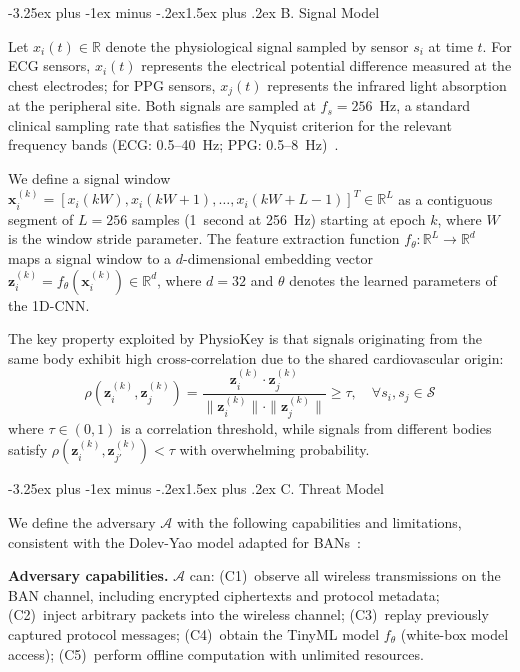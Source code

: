 \documentclass[10pt,twocolumn]{article}
\makeatletter
\renewcommand{\subsection}{\@startsection{subsection}{2}{\z@}%
  {-3.25ex plus -1ex minus -.2ex}{1.5ex plus .2ex}%
  {\normalfont\normalsize\bfseries\itshape}}
\makeatother
\begin{document}
\subsection{B. Signal Model}
\label{subsec:signal_model}

Let $x_i(t) \in \mathbb{R}$ denote the physiological signal sampled by sensor $s_i$ at time $t$. For ECG sensors, $x_i(t)$ represents the electrical potential difference measured at the chest electrodes; for PPG sensors, $x_j(t)$ represents the infrared light absorption at the peripheral site. Both signals are sampled at $f_s = 256$~Hz, a standard clinical sampling rate that satisfies the Nyquist criterion for the relevant frequency bands (ECG: 0.5--40~Hz; PPG: 0.5--8~Hz)~\cite{clifford2006advanced}.

We define a signal window $\mathbf{x}_i^{(k)} = [x_i(kW), x_i(kW+1), \ldots, x_i(kW+L-1)]^T \in \mathbb{R}^L$ as a contiguous segment of $L = 256$ samples (1~second at 256~Hz) starting at epoch $k$, where $W$ is the window stride parameter. The feature extraction function $f_\theta: \mathbb{R}^L \rightarrow \mathbb{R}^d$ maps a signal window to a $d$-dimensional embedding vector $\mathbf{z}_i^{(k)} = f_\theta(\mathbf{x}_i^{(k)}) \in \mathbb{R}^d$, where $d = 32$ and $\theta$ denotes the learned parameters of the 1D-CNN.

The key property exploited by PhysioKey is that signals originating from the same body exhibit high cross-correlation due to the shared cardiovascular origin:
\begin{equation}
\label{eq:correlation}
\rho(\mathbf{z}_i^{(k)}, \mathbf{z}_j^{(k)}) = \frac{\mathbf{z}_i^{(k)} \cdot \mathbf{z}_j^{(k)}}{\|\mathbf{z}_i^{(k)}\| \cdot \|\mathbf{z}_j^{(k)}\|} \geq \tau, \quad \forall s_i, s_j \in \mathcal{S}
\end{equation}
where $\tau \in (0,1)$ is a correlation threshold, while signals from different bodies satisfy $\rho(\mathbf{z}_i^{(k)}, \mathbf{z}_{j'}^{(k)}) < \tau$ with overwhelming probability.

\subsection{C. Threat Model}
\label{subsec:threat_model}

We define the adversary $\mathcal{A}$ with the following capabilities and limitations, consistent with the Dolev-Yao model adapted for BANs~\cite{dolev1983security}:

\textbf{Adversary capabilities.} $\mathcal{A}$ can: (C1)~observe all wireless transmissions on the BAN channel, including encrypted ciphertexts and protocol metadata; (C2)~inject arbitrary packets into the wireless channel; (C3)~replay previously captured protocol messages; (C4)~obtain the TinyML model $f_\theta$ (white-box model access); (C5)~perform offline computation with unlimited resources.
\end{document}

